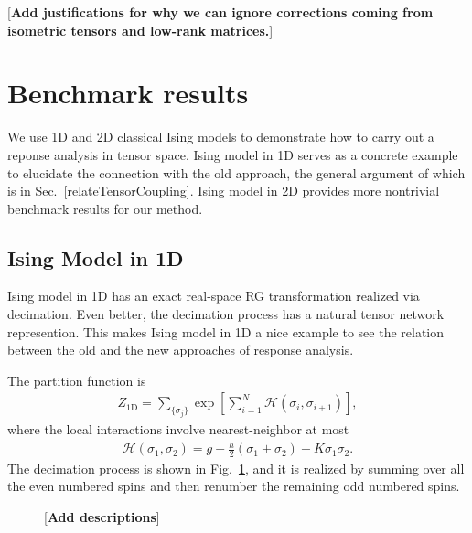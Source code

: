 \documentclass[aps,prb,reprint,superscriptaddress]{revtex4-2}
\begin{document}
[\textbf{Add justifications for why we can ignore corrections coming from
isometric tensors and low-rank matrices.}]

\section{Benchmark results\label{benchmark}}
We use 1D and 2D classical Ising models to demonstrate how to carry out
a reponse analysis in tensor space. Ising model in 1D serves as a
concrete example to elucidate the connection with the old approach, the
general argument of which is in Sec.~\ref{relateTensorCoupling}. Ising
model in 2D provides more nontrivial benchmark results for our method.
%

\subsection{Ising Model in 1D\label{benchmark:1DIsing}}
Ising model in 1D has an exact real-space RG transformation realized via
decimation. Even better, the decimation process has a natural tensor
network represention. This makes Ising model in 1D a nice example to see
the relation between the old and the new approaches of response
analysis.
%

The partition function is
%
\begin{align}\label{def:Z4Ising1D}
    Z_{\text{1D}} = \sum_{\{\sigma_j \} } \exp{\left[\sum_{i=1}^N
    \mathscr{H}\left(\sigma_i,\sigma_{i+1}\right)  \right]},
\end{align}
%
where the local interactions involve nearest-neighbor at most
%
\begin{align}\label{def:H4Ising1D}
    \mathscr{H}\left(\sigma_1, \sigma_2\right) = g +
    \frac{h}{2}\left(\sigma_1 + \sigma_2\right) + K\sigma_1 \sigma_2.
\end{align}
%
The decimation process is shown in Fig.~\ref{fig:Ising1D-decimation},
and it is realized by summing over all the even numbered spins and then
renumber the remaining odd numbered spins. 
%
\begin{figure}[h]
    \caption{\label{fig:Ising1D-decimation}[\textbf{Add descriptions}]}
\end{figure}
%
\end{document}
